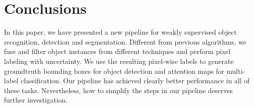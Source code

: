 \documentclass[10pt,twocolumn,letterpaper]{article}
\begin{document}
\section{Conclusions}\vspace{-2mm}
In this paper, we have presented a new pipeline for weakly supervised object recognition, detection and segmentation. Different from previous algorithms, we fuse and filter object instances from different techniques and perform pixel labeling with uncertainty. We use the resulting pixel-wise labels to generate groundtruth bounding boxes for object detection and attention maps for multi-label classification. Our pipeline has achieved clearly better performance in all of these tasks. Nevertheless, how to simplify the steps in our pipeline deserves further investigation.


{\small


}
\end{document}
